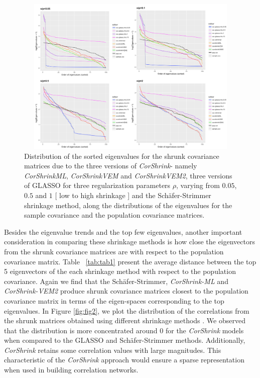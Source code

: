 \begin{figure}[ht]
\raggedleft
\includegraphics[height=3in, width=6in]{eigenval_dist_2.pdf}
 \caption{Distribution of the sorted eigenvalues for the shrunk covariance matrices due to the three versions of \textit{CorShrink}- namely \textit{CorShrinkML}, \textit{CorShrinkVEM} and \textit{CorShrinkVEM2}, three versions of GLASSO for three regularization parameters $\rho$, varying from $0.05$, $0.5$ and $1$  [ low to high shrinkage ] and the Sch\"{a}fer-Strimmer shrinkage method, along the distributions of the eigenvalues for the sample covariance and the population covariance matrices.}
\label{fig:fig1}
\end{figure}

Besides the eigenvalue trends and the top few eigenvalues, another important consideration in comparing these shrinkage methods is how close the eigenvectors from the shrunk covariance matrices are with respect to the population covariance matrix. Table ~\ref{tab:tab1} present the average distance between the top 5 eigenvectors of the each shrinkage method with respect to the population covariance. Again we find that the Sch\"{a}fer-Strimmer, \textit{CorShrink-ML} and \textit{CorShrink-VEM2}  produce shrunk covariance matrices closest to the population covariance matrix in terms of the eigen-spaces corresponding to the top eigenvalues. In Figure \ref{fig:fig2}, we plot the distribution of the correlations from the shrunk matrices obtained using different shrinkage methods . We observed that the distribution is more concentrated around $0$ for the  \textit{CorShrink} models when compared to the GLASSO and Sch\"{a}fer-Strimmer methods. Additionally,  \textit{CorShrink} retains some correlation values with large magnitudes. This characteristic of the  \textit{CorShrink} approach would ensure a sparse representation when used in building correlation networks.




